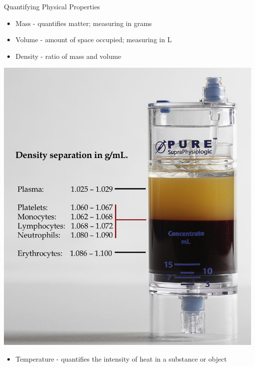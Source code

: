 \documentclass[11pt]{beamer}
\begin{document}
\begin{frame}{Quantifying Physical Properties}
  \begin{itemize}
  \item Mass - quantifies matter; measuring in grams
  \item Volume - amount of space occupied; measuring in L
  \item Density - ratio of mass and volume
  \end{itemize}
  \centering
  \includegraphics[scale=0.14]{dens_liquids}
  \begin{itemize}
  \item Temperature - quantifies the intensity of heat in a substance
    or object
  \end{itemize}
\end{frame}
\end{document}
